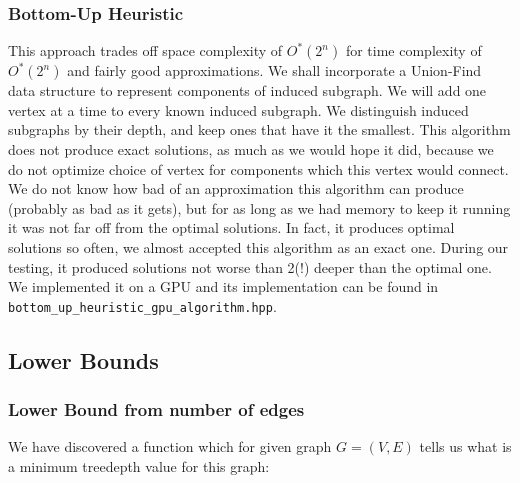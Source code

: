 \documentclass[a4paper]{article}
\begin{document}
	\subsubsection{Bottom-Up Heuristic}
	This approach trades off space complexity of $O^*\left(2^n\right)$ for time complexity of  $O^*\left(2^n\right)$ and fairly good approximations. We shall incorporate a Union-Find data structure to represent components of induced subgraph. We will add one vertex at a time to every known induced subgraph. We distinguish induced subgraphs by their depth, and keep ones that have it the smallest. This algorithm does not produce exact solutions, as much as we would hope it did, because we do not optimize choice of vertex for components which this vertex would connect. We do not know how bad of an approximation this algorithm can produce (probably as bad as it gets), but for as long as we had memory to keep it running it was not far off from the optimal solutions. In fact, it produces optimal solutions so often, we almost accepted this algorithm as an exact one. During our testing, it produced solutions not worse than 2(!) deeper than the optimal one. We implemented it on a GPU and its implementation can be found in \texttt{bottom\_up\_heuristic\_gpu\_algorithm.hpp}.
	\subsection{Lower Bounds}
	\subsubsection{Lower Bound from number of edges}
	We have discovered a function which for given graph $G=(V,E)$ tells us what is a minimum treedepth value for this graph:
	
\end{document}
